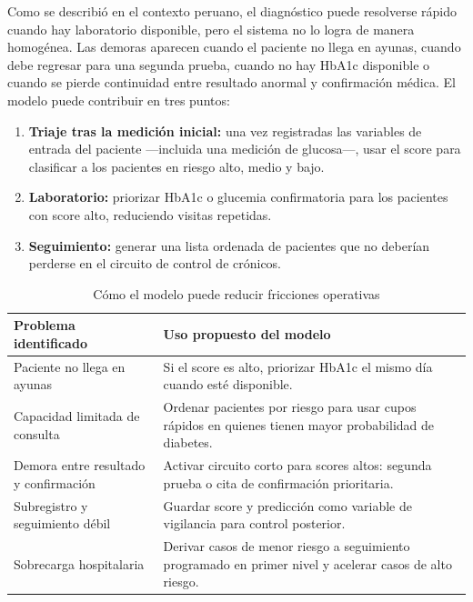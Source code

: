 \documentclass[conference]{IEEEtran}
\begin{document}
Como se describió en el contexto peruano, el diagnóstico puede resolverse rápido cuando hay laboratorio disponible, pero el sistema no lo logra de manera homogénea. Las demoras aparecen cuando el paciente no llega en ayunas, cuando debe regresar para una segunda prueba, cuando no hay HbA1c disponible o cuando se pierde continuidad entre resultado anormal y confirmación médica. El modelo puede contribuir en tres puntos:

\begin{enumerate}[leftmargin=1.3em,itemsep=1pt]
  \item \textbf{Triaje tras la medición inicial:} una vez registradas las variables de entrada del paciente ---incluida una medición de glucosa---, usar el score para clasificar a los pacientes en riesgo alto, medio y bajo.
  \item \textbf{Laboratorio:} priorizar HbA1c o glucemia confirmatoria para los pacientes con score alto, reduciendo visitas repetidas.
  \item \textbf{Seguimiento:} generar una lista ordenada de pacientes que no deberían perderse en el circuito de control de crónicos.
\end{enumerate}

\begin{table}[H]
\centering
\caption{Cómo el modelo puede reducir fricciones operativas}
\label{tab:impacto_modelo}
\scriptsize
\begin{tabularx}{\columnwidth}{@{}lX@{}}
\toprule
\textbf{Problema identificado} & \textbf{Uso propuesto del modelo} \\
\midrule
Paciente no llega en ayunas & Si el score es alto, priorizar HbA1c el mismo día cuando esté disponible. \\
Capacidad limitada de consulta & Ordenar pacientes por riesgo para usar cupos rápidos en quienes tienen mayor probabilidad de diabetes. \\
Demora entre resultado y confirmación & Activar circuito corto para scores altos: segunda prueba o cita de confirmación prioritaria. \\
Subregistro y seguimiento débil & Guardar score y predicción como variable de vigilancia para control posterior. \\
Sobrecarga hospitalaria & Derivar casos de menor riesgo a seguimiento programado en primer nivel y acelerar casos de alto riesgo. \\
\bottomrule
\end{tabularx}
\end{table}
\end{document}
